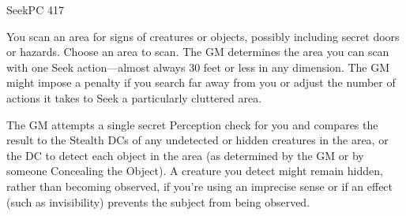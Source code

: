 \documentclass[12pt,openany,twocolumn]{book}
\begin{document}
\begin{action}{Seek}{}{PC 417}
    \begin{actioninfo}
    \end{actioninfo}

    \begin{actionbody}
        You scan an area for signs of creatures or objects, possibly including secret doors or hazards. Choose an area to scan. The GM determines the area you can scan with one Seek action—almost always 30 feet or less in any dimension. The GM might impose a penalty if you search far away from you or adjust the number of actions it takes to Seek a particularly cluttered area.

        The GM attempts a single secret Perception check for you and compares the result to the Stealth DCs of any undetected or hidden creatures in the area, or the DC to detect each object in the area (as determined by the GM or by someone Concealing the Object). A creature you detect might remain hidden, rather than becoming observed, if you're using an imprecise sense or if an effect (such as invisibility) prevents the subject from being observed.
    \end{actionbody}


\end{action}
\end{document}
